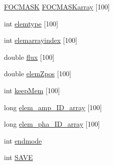 \begin{DoxyCompactItemize}
\hyperlink{structFOCMASK}{F\+O\+C\+M\+A\+S\+K} \hyperlink{structOPTSYST_a8d4ccf0884791758d77f5488ddf93bb0}{F\+O\+C\+M\+A\+S\+Karray} \mbox{[}100\mbox{]}
\item 
int \hyperlink{structOPTSYST_a63f311eb16fa637a8e1cd2102540c67d}{elemtype} \mbox{[}100\mbox{]}
\item 
int \hyperlink{structOPTSYST_a32962b27534c2f242eeb7183237f319f}{elemarrayindex} \mbox{[}100\mbox{]}
\item 
double \hyperlink{structOPTSYST_a50cc581680a3ba2856a0ba03f1ea97c0}{flux} \mbox{[}100\mbox{]}
\item 
double \hyperlink{structOPTSYST_a80079ae1f8045368a8e009e4ceda76a1}{elem\+Zpos} \mbox{[}100\mbox{]}
\item 
int \hyperlink{structOPTSYST_a542117d96bcee0d0787417101c5f9664}{keep\+Mem} \mbox{[}100\mbox{]}
\item 
long \hyperlink{structOPTSYST_a0d0a44c7ffab65020c28c6b64668ebf4}{elem\+\_\+amp\+\_\+\+I\+D\+\_\+array} \mbox{[}100\mbox{]}
\item 
long \hyperlink{structOPTSYST_ae568b4a9a7cb9030a0e2a513ab4ade4a}{elem\+\_\+pha\+\_\+\+I\+D\+\_\+array} \mbox{[}100\mbox{]}
\item 
int \hyperlink{structOPTSYST_a98b8c66b45d6534f830d5cfe9fb39b17}{endmode}
\item 
int \hyperlink{structOPTSYST_a1edeacc3267a9dae94f74a7ae2d5d668}{S\+A\+V\+E}
\end{DoxyCompactItemize}


